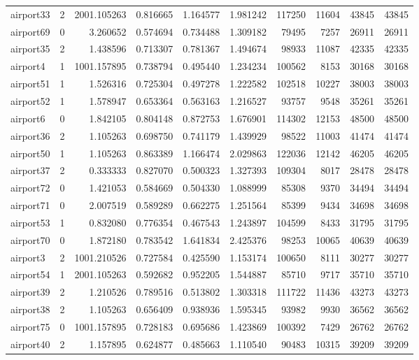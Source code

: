 \begin{longtable}{|l|r|r|r|r|r|r|r|r|r|}
airport33 & 2 & 2001.105263 & 0.816665 & 1.164577 & 1.981242 & 117250 & 11604 & 43845 & 43845 \\
airport69 & 0 & 3.260652 & 0.574694 & 0.734488 & 1.309182 & 79495 & 7257 & 26911 & 26911 \\
airport35 & 2 & 1.438596 & 0.713307 & 0.781367 & 1.494674 & 98933 & 11087 & 42335 & 42335 \\
airport4 & 1 & 1001.157895 & 0.738794 & 0.495440 & 1.234234 & 100562 & 8153 & 30168 & 30168 \\
airport51 & 1 & 1.526316 & 0.725304 & 0.497278 & 1.222582 & 102518 & 10227 & 38003 & 38003 \\
airport52 & 1 & 1.578947 & 0.653364 & 0.563163 & 1.216527 & 93757 & 9548 & 35261 & 35261 \\
airport6 & 0 & 1.842105 & 0.804148 & 0.872753 & 1.676901 & 114302 & 12153 & 48500 & 48500 \\
airport36 & 2 & 1.105263 & 0.698750 & 0.741179 & 1.439929 & 98522 & 11003 & 41474 & 41474 \\
airport50 & 1 & 1.105263 & 0.863389 & 1.166474 & 2.029863 & 122036 & 12142 & 46205 & 46205 \\
airport37 & 2 & 0.333333 & 0.827070 & 0.500323 & 1.327393 & 109304 & 8017 & 28478 & 28478 \\
airport72 & 0 & 1.421053 & 0.584669 & 0.504330 & 1.088999 & 85308 & 9370 & 34494 & 34494 \\
airport71 & 0 & 2.007519 & 0.589289 & 0.662275 & 1.251564 & 85399 & 9434 & 34698 & 34698 \\
airport53 & 1 & 0.832080 & 0.776354 & 0.467543 & 1.243897 & 104599 & 8433 & 31795 & 31795 \\
airport70 & 0 & 1.872180 & 0.783542 & 1.641834 & 2.425376 & 98253 & 10065 & 40639 & 40639 \\
airport3 & 2 & 1001.210526 & 0.727584 & 0.425590 & 1.153174 & 100650 & 8111 & 30277 & 30277 \\
airport54 & 1 & 2001.105263 & 0.592682 & 0.952205 & 1.544887 & 85710 & 9717 & 35710 & 35710 \\
airport39 & 2 & 1.210526 & 0.789516 & 0.513802 & 1.303318 & 111722 & 11436 & 43273 & 43273 \\
airport38 & 2 & 1.105263 & 0.656409 & 0.938936 & 1.595345 & 93982 & 9930 & 36562 & 36562 \\
airport75 & 0 & 1001.157895 & 0.728183 & 0.695686 & 1.423869 & 100392 & 7429 & 26762 & 26762 \\
airport40 & 2 & 1.157895 & 0.624877 & 0.485663 & 1.110540 & 90483 & 10315 & 39209 & 39209 \\

\end{longtable}
